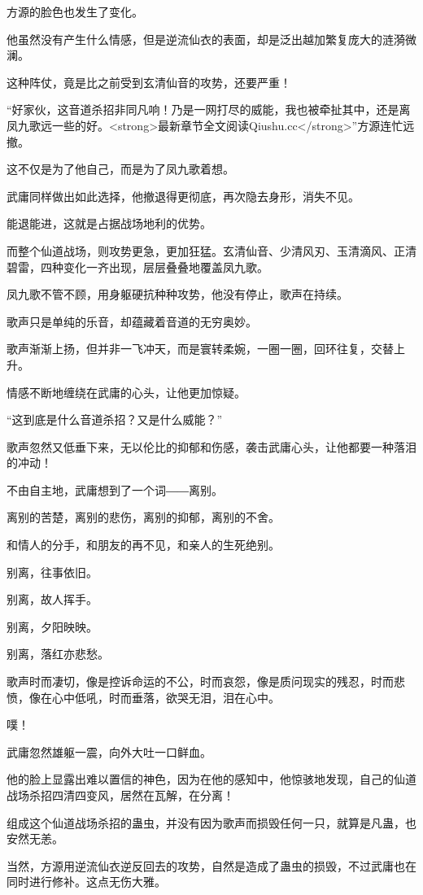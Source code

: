 \begin{this_body}
方源的脸色也发生了变化。

他虽然没有产生什么情感，但是逆流仙衣的表面，却是泛出越加繁复庞大的涟漪微澜。

这种阵仗，竟是比之前受到玄清仙音的攻势，还要严重！

“好家伙，这音道杀招非同凡响！乃是一网打尽的威能，我也被牵扯其中，还是离凤九歌远一些的好。<strong>最新章节全文阅读Qiushu.cc</strong>”方源连忙远撤。

这不仅是为了他自己，而是为了凤九歌着想。

武庸同样做出如此选择，他撤退得更彻底，再次隐去身形，消失不见。

能退能进，这就是占据战场地利的优势。

而整个仙道战场，则攻势更急，更加狂猛。玄清仙音、少清风刃、玉清滴风、正清碧雷，四种变化一齐出现，层层叠叠地覆盖凤九歌。

凤九歌不管不顾，用身躯硬抗种种攻势，他没有停止，歌声在持续。

歌声只是单纯的乐音，却蕴藏着音道的无穷奥妙。

歌声渐渐上扬，但并非一飞冲天，而是寰转柔婉，一圈一圈，回环往复，交替上升。

情感不断地缠绕在武庸的心头，让他更加惊疑。

“这到底是什么音道杀招？又是什么威能？”

歌声忽然又低垂下来，无以伦比的抑郁和伤感，袭击武庸心头，让他都要一种落泪的冲动！

不由自主地，武庸想到了一个词――离别。

离别的苦楚，离别的悲伤，离别的抑郁，离别的不舍。

和情人的分手，和朋友的再不见，和亲人的生死绝别。

别离，往事依旧。

别离，故人挥手。

别离，夕阳映映。

别离，落红亦悲愁。

歌声时而凄切，像是控诉命运的不公，时而哀怨，像是质问现实的残忍，时而悲愤，像在心中低吼，时而垂落，欲哭无泪，泪在心中。

噗！

武庸忽然雄躯一震，向外大吐一口鲜血。

他的脸上显露出难以置信的神色，因为在他的感知中，他惊骇地发现，自己的仙道战场杀招四清四变风，居然在瓦解，在分离！

组成这个仙道战场杀招的蛊虫，并没有因为歌声而损毁任何一只，就算是凡蛊，也安然无恙。

当然，方源用逆流仙衣逆反回去的攻势，自然是造成了蛊虫的损毁，不过武庸也在同时进行修补。这点无伤大雅。


\end{this_body}
